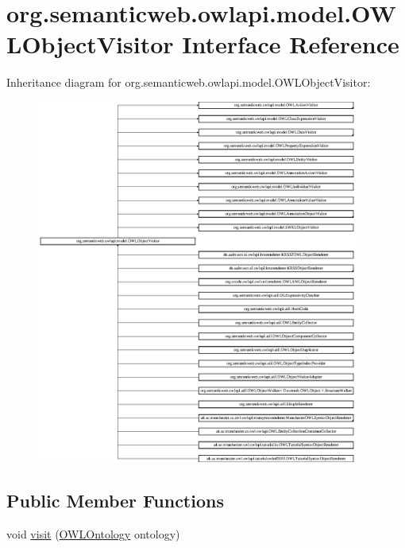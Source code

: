 \hypertarget{interfaceorg_1_1semanticweb_1_1owlapi_1_1model_1_1_o_w_l_object_visitor}{\section{org.\-semanticweb.\-owlapi.\-model.\-O\-W\-L\-Object\-Visitor Interface Reference}
\label{interfaceorg_1_1semanticweb_1_1owlapi_1_1model_1_1_o_w_l_object_visitor}
}
Inheritance diagram for org.\-semanticweb.\-owlapi.\-model.\-O\-W\-L\-Object\-Visitor\-:\begin{figure}[H]
\begin{center}
\leavevmode
\includegraphics[height=12.000000cm]{interfaceorg_1_1semanticweb_1_1owlapi_1_1model_1_1_o_w_l_object_visitor}
\end{center}
\end{figure}
\subsection*{Public Member Functions}
\begin{DoxyCompactItemize}
\item 
void \hyperlink{interfaceorg_1_1semanticweb_1_1owlapi_1_1model_1_1_o_w_l_object_visitor_a8d486522c50038a951f28ed4a11e6f60}{visit} (\hyperlink{interfaceorg_1_1semanticweb_1_1owlapi_1_1model_1_1_o_w_l_ontology}{O\-W\-L\-Ontology} ontology)
\end{DoxyCompactItemize}


